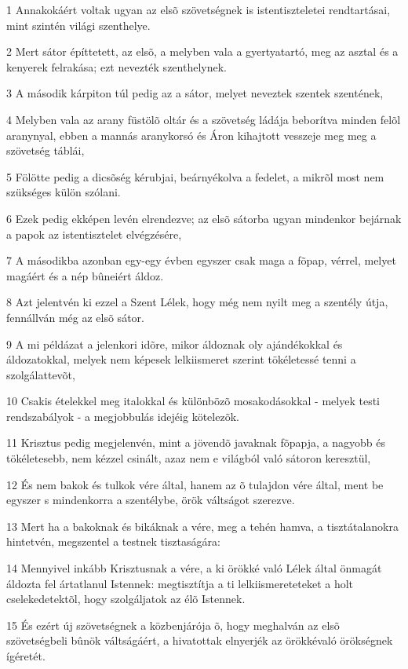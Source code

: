 \par 1 Annakokáért voltak ugyan az elsõ szövetségnek is istentiszteletei rendtartásai, mint szintén világi szenthelye.
\par 2 Mert sátor építtetett, az elsõ, a melyben vala a gyertyatartó, meg az asztal és a kenyerek felrakása; ezt nevezték szenthelynek.
\par 3 A második kárpiton túl pedig az a sátor, melyet neveztek szentek szentének,
\par 4 Melyben vala az arany füstölõ oltár és a szövetség ládája beborítva minden felõl aranynyal, ebben a mannás aranykorsó és Áron kihajtott vesszeje meg  meg a szövetség táblái,
\par 5 Fölötte pedig a dicsõség kérubjai, beárnyékolva a fedelet, a mikrõl most nem szükséges külön szólani.
\par 6 Ezek pedig ekképen levén elrendezve; az elsõ sátorba ugyan mindenkor bejárnak a papok az istentisztelet elvégzésére,
\par 7 A másodikba azonban egy-egy évben egyszer csak maga a fõpap, vérrel, melyet magáért és a nép bûneiért áldoz.
\par 8 Azt jelentvén ki ezzel a Szent Lélek, hogy még nem nyilt meg a szentély útja, fennállván még az elsõ sátor.
\par 9 A mi példázat a jelenkori idõre, mikor áldoznak oly ajándékokkal és áldozatokkal, melyek nem képesek lelkiismeret szerint tökéletessé tenni a szolgálattevõt,
\par 10 Csakis ételekkel meg italokkal és különbözõ mosakodásokkal - melyek testi rendszabályok - a megjobbulás idejéig kötelezõk.
\par 11 Krisztus pedig megjelenvén, mint a jövendõ javaknak fõpapja, a nagyobb és tökéletesebb, nem kézzel csinált, azaz nem e világból való sátoron keresztül,
\par 12 És nem bakok és tulkok vére által, hanem az õ tulajdon vére által, ment be egyszer s mindenkorra a szentélybe, örök  váltságot szerezve.
\par 13 Mert ha a bakoknak és bikáknak a vére, meg a tehén hamva,  a tisztátalanokra hintetvén, megszentel a testnek tisztaságára:
\par 14 Mennyivel inkább Krisztusnak a vére, a ki örökké való Lélek által önmagát áldozta fel ártatlanul Istennek: megtisztítja a ti lelkiismereteteket a holt cselekedetektõl, hogy szolgáljatok az élõ Istennek.
\par 15 És ezért új szövetségnek a közbenjárója õ, hogy meghalván az elsõ szövetségbeli bûnök váltságáért, a hivatottak elnyerjék az  örökkévaló örökségnek ígéretét.
